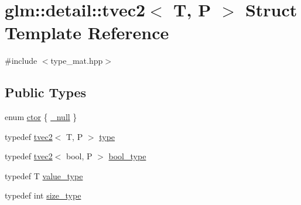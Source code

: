 \hypertarget{structglm_1_1detail_1_1tvec2}{}\section{glm\+:\+:detail\+:\+:tvec2$<$ T, P $>$ Struct Template Reference}
\label{structglm_1_1detail_1_1tvec2}


{\ttfamily \#include $<$type\+\_\+mat.\+hpp$>$}

\subsection*{Public Types}
\begin{DoxyCompactItemize}
\item 
enum \hyperlink{structglm_1_1detail_1_1tvec2_aa0bba0616f425fbd3fb5756aed326386}{ctor} \{ \hyperlink{structglm_1_1detail_1_1tvec2_aa0bba0616f425fbd3fb5756aed326386a28f42778ba30ccaf6216792ddd25eed3}{\+\_\+null}
 \}
\item 
typedef \hyperlink{structglm_1_1detail_1_1tvec2}{tvec2}$<$ T, P $>$ \hyperlink{structglm_1_1detail_1_1tvec2_a644c796a3f1da08b7481ca69fbd10818}{type}
\item 
typedef \hyperlink{structglm_1_1detail_1_1tvec2}{tvec2}$<$ bool, P $>$ \hyperlink{structglm_1_1detail_1_1tvec2_af7537fd9a8c9dae6b92100b609eb2aaf}{bool\+\_\+type}
\item 
typedef T \hyperlink{structglm_1_1detail_1_1tvec2_ab8ccd2ae98b414376608059114f5af41}{value\+\_\+type}
\item 
typedef int \hyperlink{structglm_1_1detail_1_1tvec2_a66667d9497ad5c7ff1b60bafa9fb9592}{size\+\_\+type}
\end{DoxyCompactItemize}
